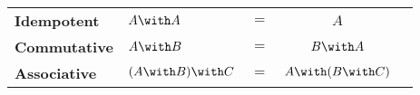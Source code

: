 
\begin{tabular}{llrcl}
  \textbf{Idempotent}  & $A \andop A$            & $=$ & $A$ \\
  \textbf{Commutative} & $A \andop B$            & $=$ & $B \andop A$ \\
  \textbf{Associative} & $(A \andop B) \andop C$ & $=$ & $A \andop (B \andop C)$ 
\end{tabular}


